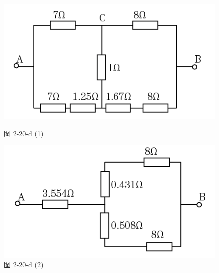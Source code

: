 \documentclass[hyperref, UTF8]{ctexart}
\begin{document}
\begin{figure}[!htb]
  \centering
  \begin{minipage}[t]{0.334\textwidth}
    \centering
    \includegraphics[width=1\textwidth]{p2-20-d-sol1.png}
    \caption*{图 2-20-d (1)}
  \end{minipage}
  \begin{minipage}[t]{0.334\textwidth}
    \centering
    \includegraphics[width=1\textwidth]{p2-20-d-sol2.png}
    \caption*{图 2-20-d (2)}
  \end{minipage}
\end{figure}
\end{document}
